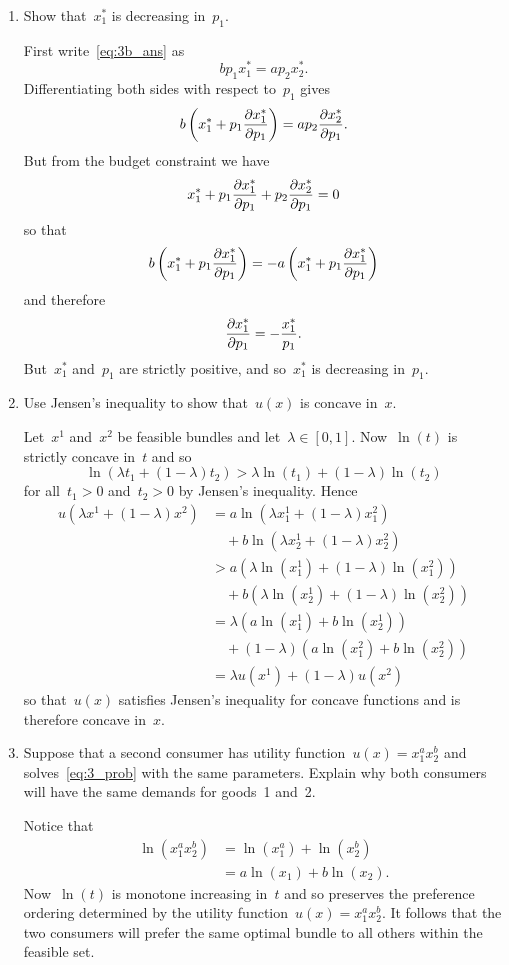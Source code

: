 \begin{enumerate}
\begin{enumerate}
		\item
		Show that~$x_1^*$ is decreasing in~$p_1$.
		\begin{solution}
			First write~\eqref{eq:3b_ans} as
			\[ bp_1x_1^*=ap_2x_2^*. \]
			Differentiating both sides with respect to~$p_1$ gives
			\[ b\left(x_1^*+p_1\frac{\partial x_1^*}{\partial p_1}\right)=ap_2\frac{\partial x_2^*}{\partial p_1}. \]
			But from the budget constraint we have
			\[ x_1^*+p_1\frac{\partial x_1^*}{\partial p_1}+p_2\frac{\partial x_2^*}{\partial p_1}=0 \]
			so that
			\[ b\left(x_1^*+p_1\frac{\partial x_1^*}{\partial p_1}\right)=-a\left(x_1^*+p_1\frac{\partial x_1^*}{\partial p_1}\right) \]
			and therefore
			\[ \frac{\partial x_1^*}{\partial p_1}=-\frac{x_1^*}{p_1}. \]
			But~$x_1^*$ and~$p_1$ are strictly positive, and so~$x_1^*$ is decreasing in~$p_1$.
		\end{solution}

		\item
		Use Jensen's inequality to show that~$u(x)$ is concave in~$x$.
		\begin{solution}
			Let~$x^1$ and~$x^2$ be feasible bundles and let~$\lambda\in[0,1]$.
			Now~$\ln(t)$ is strictly concave in~$t$ and so
			\[ \ln(\lambda t_1+(1-\lambda)t_2)>\lambda\ln(t_1)+(1-\lambda)\ln(t_2) \]
			for all~$t_1>0$ and~$t_2>0$ by Jensen's inequality.
			Hence
			\begin{align}
				u(\lambda x^1+(1-\lambda)x^2)
				&= a\ln(\lambda x_1^1+(1-\lambda)x_1^2)\\
					&\quad+b\ln(\lambda x_2^1+(1-\lambda)x_2^2)\\
				&> a(\lambda\ln(x_1^1)+(1-\lambda)\ln(x_1^2))\\
					&\quad+b(\lambda\ln(x_2^1)+(1-\lambda)\ln(x_2^2))\\
				&= \lambda(a\ln(x_1^1)+b\ln(x_2^1))\\
					&\quad+(1-\lambda)(a\ln(x_1^2)+b\ln(x_2^2))\\
				&= \lambda u(x^1)+(1-\lambda)u(x^2)
			\end{align}
			so that~$u(x)$ satisfies Jensen's inequality for concave functions and is therefore concave in~$x$.
		\end{solution}

		\item
		Suppose that a second consumer has utility function~$u(x)=x_1^ax_2^b$ and solves~\eqref{eq:3_prob} with the same parameters.
		Explain why both consumers will have the same demands for goods~1 and~2.
		\begin{solution}
			Notice that
			\begin{align}
				\ln(x_1^ax_2^b)
				&= \ln(x_1^a)+\ln(x_2^b)\\
				&= a\ln(x_1)+b\ln(x_2).
			\end{align}
			Now~$\ln(t)$ is monotone increasing in~$t$ and so preserves the preference ordering determined by the utility function~$u(x)=x_1^ax_2^b$.
			It follows that the two consumers will prefer the same optimal bundle to all others within the feasible set.
		\end{solution}



\end{enumerate}
\end{enumerate}
